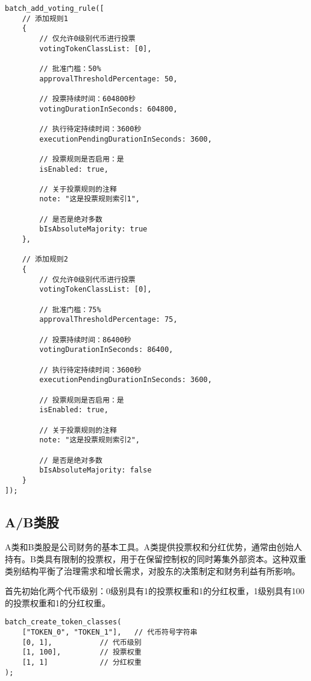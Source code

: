 \documentclass[main.tex]{subfiles}
\begin{document}
\begin{verbatim}
batch_add_voting_rule([
    // 添加规则1
    {
        // 仅允许0级别代币进行投票
        votingTokenClassList: [0], 

        // 批准门槛：50%
        approvalThresholdPercentage: 50,

        // 投票持续时间：604800秒
        votingDurationInSeconds: 604800,

        // 执行待定持续时间：3600秒
        executionPendingDurationInSeconds: 3600,

        // 投票规则是否启用：是
        isEnabled: true,

        // 关于投票规则的注释
        note: "这是投票规则索引1",

        // 是否是绝对多数
        bIsAbsoluteMajority: true
    },

    // 添加规则2
    {
        // 仅允许0级别代币进行投票
        votingTokenClassList: [0], 

        // 批准门槛：75%
        approvalThresholdPercentage: 75,

        // 投票持续时间：86400秒
        votingDurationInSeconds: 86400,

        // 执行待定持续时间：3600秒
        executionPendingDurationInSeconds: 3600,

        // 投票规则是否启用：是
        isEnabled: true,

        // 关于投票规则的注释
        note: "这是投票规则索引2",

        // 是否是绝对多数
        bIsAbsoluteMajority: false
    }
]);

\end{verbatim}


\subsection{A/B类股}

A类和B类股是公司财务的基本工具。A类提供投票权和分红优势，通常由创始人持有。B类具有限制的投票权，用于在保留控制权的同时筹集外部资本。这种双重类别结构平衡了治理需求和增长需求，对股东的决策制定和财务利益有所影响。

首先初始化两个代币级别：0级别具有1的投票权重和1的分红权重，1级别具有100的投票权重和1的分红权重。

\begin{verbatim}
batch_create_token_classes(
    ["TOKEN_0", "TOKEN_1"],   // 代币符号字符串
    [0, 1],           // 代币级别
    [1, 100],         // 投票权重
    [1, 1]            // 分红权重
);
\end{verbatim}
\end{document}
